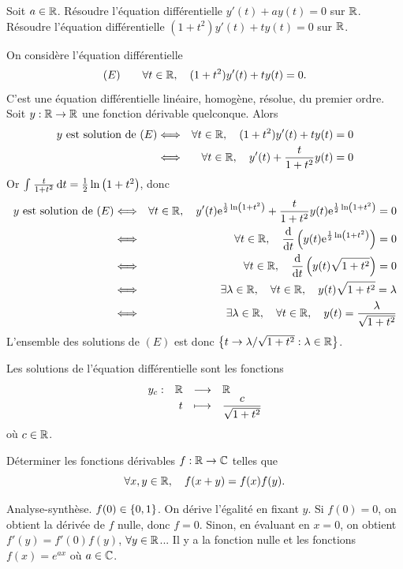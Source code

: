 \documentclass{magnoliaold}
\begin{document}
\begin{exos}
\exo Soit $a\in\mathbb{R}$. Résoudre l'équation différentielle
  $y'(t)+a y(t)=0$ sur $\mathbb{R}$.  
\exo Résoudre l'équation différentielle $(1+t^2)y'(t)+ty(t)=0$ sur $\mathbb{R}$.
\begin{sol}
\begin{francois}
On considère l'équation différentielle
\[(E)\qquad \forall t\in\mathbb{R},\quad (1+t^2)y'(t)+ty(t)=0.\]
C'est une équation différentielle linéaire, homogène, résolue, du premier ordre. Soit $y:\mathbb{R}\to\mathbb{R}$ une fonction dérivable quelconque. Alors
\begin{eqnarray*}
\text{$y$ est solution de $(E)$}
&\Longleftrightarrow& \forall t\in\mathbb{R},\quad (1+t^2)y'(t)+ty(t)=0\\
&\Longleftrightarrow& \forall t\in\mathbb{R},\quad y'(t)+\frac{t}{1+t^2} y(t)=0
\end{eqnarray*}
Or $\int_{}^{} \frac{t}{1+t^2}\,\text{d}t=\frac{1}{2}\ln\left(1+t^2\right)$, donc
\begin{eqnarray*}
\text{$y$ est solution de $(E)$}
&\Longleftrightarrow& \forall t\in\mathbb{R},\quad y'(t){\rm e}^{\frac{1}{2}\ln\left(1+t^2\right)}+\frac{t}{1+t^2}y(t){\rm e}^{\frac{1}{2}\ln\left(1+t^2\right)}=0\\
&\Longleftrightarrow& \forall t\in\mathbb{R},\quad \frac{{\rm d}}{{\rm d}t}\left(y(t){\rm e}^{\frac{1}{2}\ln\left(1+t^2\right)}\right)=0\\
&\Longleftrightarrow& \forall t\in\mathbb{R},\quad \frac{{\rm d}}{{\rm d}t}\left(y(t)\sqrt{1+t^2}\right)=0\\
&\Longleftrightarrow& \exists\lambda\in\mathbb{R},\quad \forall t\in\mathbb{R},\quad y(t)\sqrt{1+t^2}=\lambda\\
&\Longleftrightarrow& \exists\lambda\in\mathbb{R},\quad \forall t\in\mathbb{R},\quad y(t)=\frac{\lambda}{\sqrt{1+t^2}}
\end{eqnarray*}
L'ensemble des solutions de $(E)$ est donc $\left\{t\to\lambda/\sqrt{1+t^2} : \lambda\in\mathbb{R}\right\}$.
\end{francois}
\begin{victor}
Les solutions de l'équation différentielle
sont les fonctions
\[\begin{array}[t]{lrcl} \displaystyle{y_c} : & \displaystyle{\mathbb{R}} & \longrightarrow & \displaystyle{\mathbb{R}} \\ & \displaystyle{t} & \longmapsto & \displaystyle{\frac{c}{\sqrt{1+t^2}}} \end{array}\]
où $c\in\mathbb{R}$.
\end{victor}
\end{sol}
\exo Déterminer les fonctions dérivables $f:\mathbb{R}\to\mathbb{C}$ telles que
  \[\forall x,y\in\mathbb{R},\quad f(x+y)=f(x)f(y).\]
  \begin{sol}
  Analyse-synthèse. $f(0)\in\left\{0,1\right\}$. On dérive l'égalité en fixant $y$. Si $f(0)=0$, on obtient la dérivée de $f$ nulle, donc $f=0$. Sinon, en évaluant en $x=0$, on obtient $f'(y)=f'(0)f(y)$, $\forall y \in \mathbb{R}$...
  Il y a la fonction nulle et les fonctions $f(x)=e^{ax}$ où $a\in\mathbb{C}$.
  \end{sol}
\end{exos}
\end{document}
